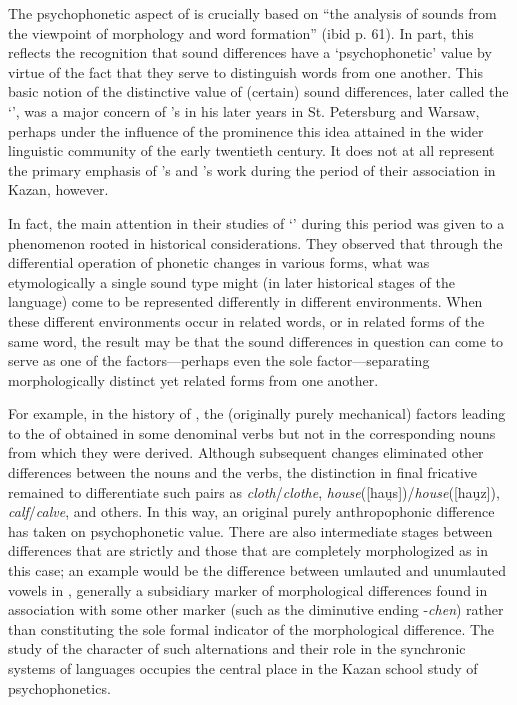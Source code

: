 The psychophonetic aspect of  is crucially based on
``the analysis of sounds from the viewpoint of morphology and word
formation'' (ibid p. 61). In part, this reflects the recognition that
sound differences have a `psychophonetic' value by virtue of the fact
that they serve to distinguish words from one another. This basic
notion of the distinctive value of (certain) sound differences, later
called the `', was a major concern of {\Baudouin}'s in
his later years in St. Petersburg and Warsaw, perhaps under the
influence of the prominence this idea attained in the wider linguistic
community of the early twentieth century. It does not at all represent
the primary emphasis of {\Baudouin}'s and {\Kruszewski}'s work during the
period of their association in Kazan, however.

In fact, the main attention in their studies of `'
during this period was given to a phenomenon rooted in historical
considerations. They observed that through the differential operation
of phonetic changes in various forms, what was etymologically a single
sound type might (in later historical stages of the language) come to
be represented differently in different environments. When these
different environments occur in related words, or in related forms of
the same word, the result may be that the sound differences in
question can come to serve as one of the factors—perhaps even the sole
factor—separating morphologically distinct yet related forms from one
another.

For example, in the history of , the (originally purely
mechanical) factors leading to the  of  obtained in
some denominal verbs but not in the corresponding nouns from which
they were derived. Although subsequent changes eliminated other
differences between the nouns and the verbs, the  distinction
in final fricative  remained to differentiate such pairs as
\emph{cloth}/\emph{clothe},
\emph{house}([\textrm{hau̯s}])/\emph{house}([\textrm{hau̯z}]),
\emph{calf}/\emph{calve}, and others. In this way, an original purely
anthropophonic difference has taken on psychophonetic value. There are
also intermediate stages between differences that are strictly
 and those that are completely morphologized as in this
case; an example would be the difference between umlauted and
unumlauted vowels in , generally a subsidiary marker of
morphological differences found in association with some other marker
(such as the diminutive ending -\emph{chen}) rather than constituting
the sole formal indicator of the morphological difference. The study
of the character of such alternations and their role in the synchronic
systems of languages occupies the central place in the Kazan school
study of psychophonetics.

